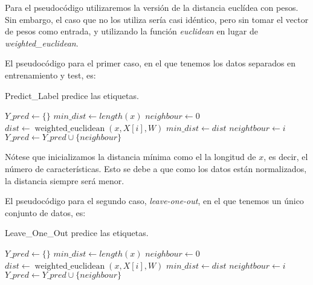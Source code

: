 \documentclass[11pt,a4paper]{article}
\begin{document}
Para el pseudocódigo utilizaremos la versión de la distancia euclídea con pesos. Sin embargo, el caso que no los utiliza sería casi idéntico, pero sin tomar el vector de pesos como entrada, y utilizando la función \emph{euclidean} en lugar de \emph{weighted\_euclidean}.

El pseudocódigo para el primer caso, en el que tenemos los datos separados en entrenamiento y test, es: \\
\begin{algorithm}[H] \label{alg:predictlabel}
	\caption{{\sc Predict\_Label} predice las etiquetas.}
	
	$Y\_pred \gets \{\}$ \;
	 {
		$min\_dist \gets length(x)$ \;
		$neighbour \gets 0$ \;
		 {
			$dist \gets \operatorname{weighted\_euclidean}(x, X[i], W)$ \;
			 {
				$min\_dist \gets dist$ \;
				$neightbour \gets i$ \;
			}
		}
		$Y\_pred \gets Y\_pred \cup \{neighbour\}$ \;
	}
	 \;
\end{algorithm}

Nótese que inicializamos la distancia mínima como el la longitud de $x$, es decir, el número de características. Esto se debe a que como los datos están normalizados, la distancia siempre será menor.

El pseudocódigo para el segundo caso, \emph{leave-one-out}, en el que tenemos un único conjunto de datos, es:
\begin{algorithm}[H] \label{alg:leaveoneout}
	\caption{{\sc Leave\_One\_Out} predice las etiquetas.}
	
	$Y\_pred \gets \{\}$ \;
	 {
		$min\_dist \gets length(x)$ \;
		$neighbour \gets 0$ \;
		 {
			 {
				$dist \gets \operatorname{weighted\_euclidean}(x, X[i], W)$ \;
				 {
					$min\_dist \gets dist$ \;
					$neightbour \gets i$ \;
				}
			}
		}
		$Y\_pred \gets Y\_pred \cup \{neighbour\}$ \;
	}
	 \;
\end{algorithm}
\end{document}
